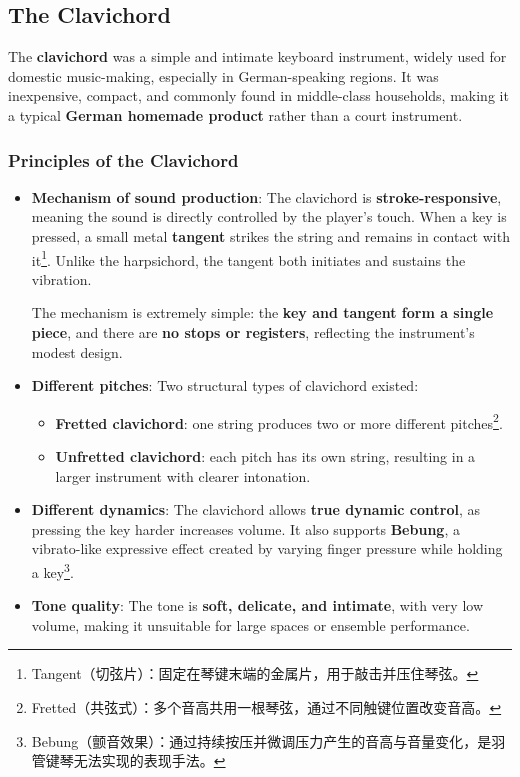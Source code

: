 \documentclass[math,code]{amznotes}
\theoremstyle{remark}
\begin{document}
\subsection{The Clavichord}

The \textbf{clavichord} was a simple and intimate keyboard instrument, widely used for domestic music-making, especially in German-speaking regions. It was inexpensive, compact, and commonly found in middle-class households, making it a typical \textbf{German homemade product} rather than a court instrument.

\subsubsection{Principles of the Clavichord}

\begin{itemize}
    \item \textbf{Mechanism of sound production}:  The clavichord is \textbf{stroke-responsive}, meaning the sound is directly controlled by the player’s touch. When a key is pressed, a small metal \textbf{tangent} strikes the string and remains in contact with it\footnote{Tangent（切弦片）：固定在琴键末端的金属片，用于敲击并压住琴弦。}. Unlike the harpsichord, the tangent both initiates and sustains the vibration.
    
    The mechanism is extremely simple: the \textbf{key and tangent form a single piece}, and there are \textbf{no stops or registers}, reflecting the instrument’s modest design.
    \item \textbf{Different pitches}: Two structural types of clavichord existed:
    \begin{itemize}
        \item \textbf{Fretted clavichord}: one string produces two or more different pitches\footnote{Fretted（共弦式）：多个音高共用一根琴弦，通过不同触键位置改变音高。}.
        \item \textbf{Unfretted clavichord}: each pitch has its own string, resulting in a larger instrument with clearer intonation.
    \end{itemize}
    \item \textbf{Different dynamics}: The clavichord allows \textbf{true dynamic control}, as pressing the key harder increases volume. It also supports \textbf{Bebung}, a vibrato-like expressive effect created by varying finger pressure while holding a key\footnote{Bebung（颤音效果）：通过持续按压并微调压力产生的音高与音量变化，是羽管键琴无法实现的表现手法。}.
    \item \textbf{Tone quality}: The tone is \textbf{soft, delicate, and intimate}, with very low volume, making it unsuitable for large spaces or ensemble performance.
\end{itemize}
\end{document}
